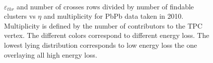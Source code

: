 \documentclass[12pt]{article}
\newlength{\mylinewidth}
\begin{document}
\begin{figure}[htbp]
\centering \mbox{
  }
  \caption[]{$\varepsilon_{thr}$ and number of crosses rows divided by number of findable clusters vs $\eta$ and multiplicity for PbPb data taken in 2010. Multiplicity is defined by the number of contributors to the TPC vertex. The different colors correspond to different energy loss. The lowest lying distribution corresponds to low energy loss the one overlaying all high energy loss.}
\label{fig_2dim_dep}
\end{figure}
\end{document}
